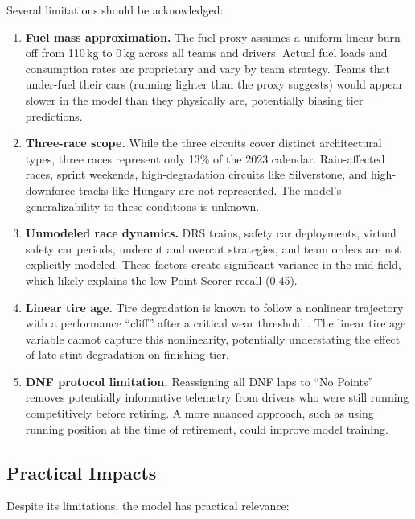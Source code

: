 Several limitations should be acknowledged:

\begin{enumerate}
  \item \textbf{Fuel mass approximation.} The fuel proxy assumes a uniform
    linear burn-off from 110\,kg to 0\,kg across all teams and drivers.
    Actual fuel loads and consumption rates are proprietary and vary by team
    strategy. Teams that under-fuel their cars (running lighter than the
    proxy suggests) would appear slower in the model than they physically
    are, potentially biasing tier predictions.

  \item \textbf{Three-race scope.} While the three circuits cover distinct
    architectural types, three races represent only 13\% of the 2023
    calendar. Rain-affected races, sprint weekends, high-degradation circuits
    like Silverstone, and high-downforce tracks like Hungary are not
    represented. The model's generalizability to these conditions is unknown.

  \item \textbf{Unmodeled race dynamics.} DRS trains, safety car deployments,
    virtual safety car periods, undercut and overcut strategies, and team
    orders are not explicitly modeled. These factors create significant
    variance in the mid-field, which likely explains the low Point Scorer
    recall (0.45).

  \item \textbf{Linear tire age.} Tire degradation is known to follow a
    nonlinear trajectory with a performance ``cliff'' after a critical wear
    threshold \parencite{baldi2022}. The linear tire age variable cannot
    capture this nonlinearity, potentially understating the effect of
    late-stint degradation on finishing tier.

  \item \textbf{DNF protocol limitation.} Reassigning all DNF laps to ``No
    Points'' removes potentially informative telemetry from drivers who were
    still running competitively before retiring. A more nuanced approach,
    such as using running position at the time of retirement, could improve
    model training.
\end{enumerate}

\subsection{Practical Impacts}

Despite its limitations, the model has practical relevance:

